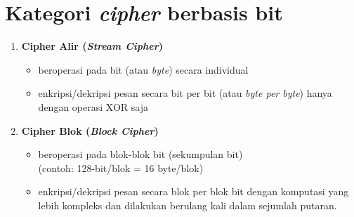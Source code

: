 \documentclass{article}
\begin{document}

\section*{Kategori \textit{cipher} berbasis bit}

\begin{enumerate}
    \item \textbf{Cipher Alir (\textit{Stream Cipher})}
    \begin{itemize}
        \item beroperasi pada bit (atau \textit{byte}) secara individual
        \item enkripsi/dekripsi pesan secara bit per bit (atau \textit{byte per byte}) hanya dengan operasi XOR saja
    \end{itemize}
    
    \item \textbf{Cipher Blok (\textit{Block Cipher})}
    \begin{itemize}
        \item beroperasi pada blok-blok bit (sekumpulan bit) \\ (contoh: 128-bit/blok = 16 byte/blok)
        \item enkripsi/dekripsi pesan secara blok per blok bit dengan komputasi yang lebih kompleks dan dilakukan berulang kali dalam sejumlah putaran.
    \end{itemize}
\end{enumerate}
\end{document}
